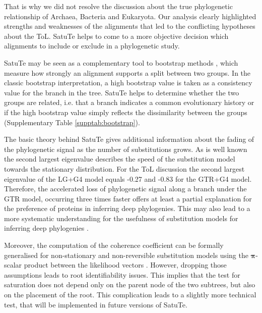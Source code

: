 \medskip

That is why we did not resolve the discussion about the true phylogenetic relationship of Archaea, Bacteria and Eukaryota. Our analysis clearly highlighted strengths and weaknesses of the alignments that led to the conflicting hypotheses about the ToL. SatuTe helps to come to a more objective decision which alignments to include or exclude in a phylogenetic study. 

\medskip

SatuTe may be seen as a complementary tool to bootstrap methods  , which measure how strongly an alignment supports a split between two groups. In the classic bootstrap interpretation, a high bootstrap value is taken as a consistency value for the branch in the tree. SatuTe helps to determine whether the two groups are related, i.e. that a branch indicates a common evolutionary history or if the high bootstrap value simply reflects the dissimilarity between the groups (Supplementary Table \ref{supptab:bootstrap}).

\medskip

The basic theory behind SatuTe gives additional information about the fading of the phylogenetic signal as the number of substitutions grows. As is well known  the second largest eigenvalue describes the speed of the substitution model towards the stationary distribution. For the ToL discussion the second
largest eigenvalue of the LG+G4 model equals -0.27 and -0.83 for the GTR+G4 model. Therefore, the accelerated loss of phylogenetic signal along a branch under the GTR model, occurring three times faster offers at least a partial explanation for the preference of proteins in inferring deep phylogenies. This may also lead to a more systematic understanding for the usefulness of substitution models for inferring deep phylogenies .

\medskip 

Moreover, the computation of the coherence coefficient can be formally generalised for non-stationary and non-reversible substitution models using the $\bm{\pi}$-scalar product  between the likelihood vectors . However, dropping those assumptions leads to root identifiability issues. This implies that the test for saturation does not depend only on the parent node of the two subtrees, but also on the placement of the root. This complication leads to a slightly more technical test, that will be implemented in future versions of SatuTe.

